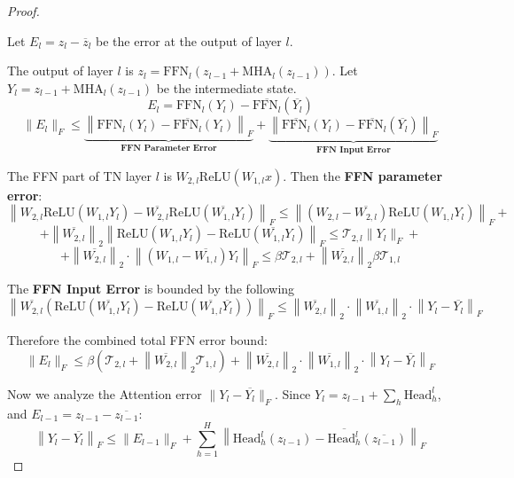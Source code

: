 \documentclass[a4paper,14pt]{extarticle}
\begin{document}
    \begin{proof}$~$

        Let $E_l = z_l - \overline{z}_l$ be the error at the output of layer $l$.

        The output of layer $l$ is $z_l = \text{FFN}_l(z_{l-1} + \text{MHA}_l(z_{l-1}))$. Let $Y_l = z_{l-1} + \text{MHA}_l(z_{l-1})$ be the intermediate state.
        $$ E_l = \text{FFN}_l(Y_l) - \overline{\text{FFN}_l}(\overline{Y_l}) $$
        $$ \|E_l\|_F \le \underbrace{\left\| \text{FFN}_l(Y_l) - \overline{\text{FFN}_l}(Y_l) \right\|_F}_{\textbf{FFN Parameter Error}} + \underbrace{\left\| \overline{\text{FFN}_l}(Y_l) - \overline{\text{FFN}_l}(\overline{Y_l}) \right\|_F}_{\textbf{FFN Input Error}} $$

        The FFN part of TN layer $l$ is $W_{2,l} \text{ReLU}(W_{1,l} x)$. Then the \textbf{FFN parameter error}:
        $$\left\|W_{2,l} \text{ReLU}(W_{1,l} Y_l) - \overline{W_{2,l}} \text{ReLU}(\overline{W_{1,l}} Y_l)\right\|_F \leqslant \left\|(W_{2,l} - \overline{W_{2,l}})\text{ReLU}(W_{1,l} Y_l)\right\|_F + $$
        $$+ \left\|\overline{W_{2,l}}\right\|_2 \left\|\text{ReLU}(W_{1,l} Y_l) - \text{ReLU}(\overline{W_{1,l}} Y_l)\right\|_F \leqslant \mathcal{T}_{2,l} \|Y_l\|_F +$$
        $$ + \left\|\overline{W_{2,l}}\right\|_2 \cdot \left\|(W_{1,l} - \overline{W_{1,l}}) Y_l\right\|_F \leqslant \beta \mathcal{T}_{2,l} + \left\|\overline{W_{2,l}}\right\|_2 \beta \mathcal{T}_{1,l} $$

        The \textbf{FFN Input Error} is bounded by the following
        $$\left\|\overline{W_{2,l}}(\text{ReLU}(\overline{W_{1,l}} Y_l) - \text{ReLU}(\overline{W_{1,l}} \overline{Y_l}))\right\|_F \leqslant \left\|\overline{W_{2,l}}\right\|_2 \cdot \left\|\overline{W_{1,l}}\right\|_2 \cdot \left\|Y_l - \overline{Y_l}\right\|_F $$

        Therefore the combined total FFN error bound:
        $$ \|E_l\|_F \leqslant \beta (\mathcal{T}_{2,l} + \left\|\overline{W_{2,l}}\right\|_2 \mathcal{T}_{1,l}) + \left\|\overline{W_{2,l}}\right\|_2 \cdot \left\|\overline{W_{1,l}}\right\|_2 \cdot \left\|Y_l - \overline{Y_l}\right\|_F $$

        Now we analyze the Attention error $\|Y_l - \overline{Y_l}\|_F$. Since $Y_l = z_{l-1} + \sum_h \text{Head}_h^l$, and $E_{l-1} = z_{l-1} - \overline{z_{l-1}}$:
        $$ \left\|Y_l - \overline{Y_l}\right\|_F \leqslant \|E_{l-1}\|_F + \sum_{h=1}^H \left\| \text{Head}_h^l(z_{l-1}) - \overline{\text{Head}_h^l}(\overline{z_{l-1}}) \right\|_F $$


\end{proof}
\end{document}
